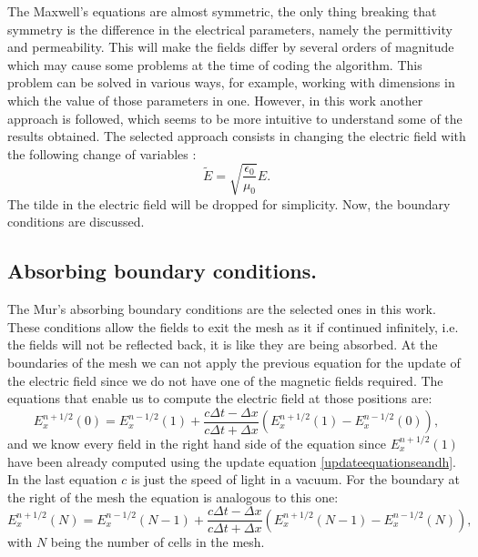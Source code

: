 \documentclass[12pt, oneside]{book}
\begin{document}
\indent The Maxwell's equations are almost symmetric, the only thing breaking that symmetry is the difference in the electrical parameters, namely the permittivity and permeability. This will make the fields differ by several orders of magnitude which may cause some problems at the time of coding the algorithm. This problem can be solved in various ways, for example, working with dimensions in which the value of those parameters in one. However, in this work another approach is followed, which seems to be more intuitive to understand some of the results obtained. The selected approach consists in changing the electric field with the following change of variables \cite{houle2020electromagnetic}:
\begin{equation}\label{changeofvariable}
\tilde{E}=\sqrt{\frac{\epsilon_0}{\mu_0}} E.
\end{equation}
The tilde in the electric field will be dropped for simplicity. Now, the boundary conditions are discussed.

\subsection{Absorbing boundary conditions.}
The Mur's absorbing boundary conditions \cite{mur1981absorbing} are the selected ones in this work. These conditions allow the fields to exit the mesh as it if continued infinitely, i.e. the fields will not be reflected back, it is like they are being absorbed. At the boundaries of the mesh we can not apply the previous equation for the update of the electric field since we do not have one of the magnetic fields required. The equations that enable us to compute the electric field at those positions are:
\begin{equation}\label{boundarycondition1}
E_{x}^{n+1 / 2}(0)=E_{x}^{n-1 / 2}(1)+\frac{c \Delta t-\Delta x}{c \Delta t+\Delta x}\left(E_{x}^{n+1 / 2}(1)-E_{x}^{n-1 / 2}(0)\right),
\end{equation}
and we know every field in the right hand side of the equation since $E_{x}^{n+1 / 2}(1)$ have been already computed using the update equation \ref{updateequationseandh}. In the last equation $c$ is just the speed of light in a vacuum. For the boundary at the right of the mesh the equation is analogous to this one:
\begin{equation}\label{boundarycondition2}
E_{x}^{n+1 / 2}(N)=E_{x}^{n-1 / 2}(N-1)+\frac{c \Delta t-\Delta x}{c \Delta t+\Delta x}\left(E_{x}^{n+1 / 2}(N-1)-E_{x}^{n-1 / 2}(N)\right),
\end{equation}
with $N$ being the number of cells in the mesh.
\end{document}
